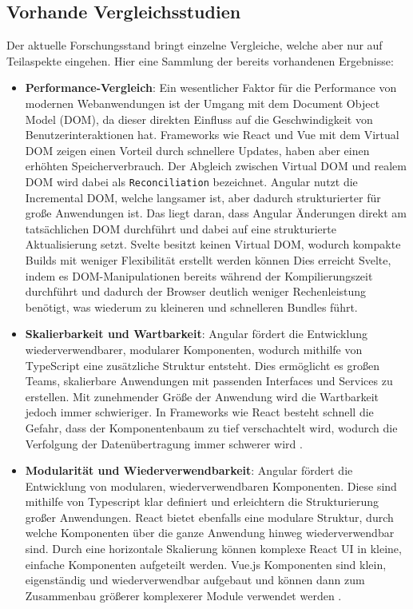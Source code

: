 \documentclass[oneside]{ausarbeitung}
\begin{document}
\subsection{Vorhande Vergleichsstudien}
Der aktuelle Forschungsstand bringt einzelne Vergleiche, welche aber nur auf Teilaspekte eingehen. Hier eine Sammlung der bereits vorhandenen Ergebnisse: 
\begin{itemize}
\item \textbf{Performance-Vergleich}: Ein wesentlicher Faktor für die Performance von modernen Webanwendungen ist der Umgang mit dem Document Object Model (DOM), da dieser direkten Einfluss auf die Geschwindigkeit von Benutzerinteraktionen hat. 
Frameworks wie React und Vue mit dem Virtual DOM zeigen einen Vorteil durch schnellere Updates, haben aber einen erhöhten Speicherverbrauch. Der Abgleich zwischen Virtual DOM und realem DOM wird dabei als \texttt{Reconciliation} bezeichnet. Angular nutzt die Incremental DOM, welche langsamer ist, aber dadurch strukturierter für große Anwendungen ist. Das liegt daran, dass Angular Änderungen direkt am tatsächlichen DOM durchführt und dabei auf eine strukturierte Aktualisierung setzt. Svelte besitzt keinen Virtual DOM, wodurch kompakte Builds mit weniger Flexibilität erstellt werden können\parencite[S.61]{js-framework-comparison}
Dies erreicht Svelte, indem es DOM-Manipulationen bereits während der Kompilierungszeit durchführt und dadurch der Browser deutlich weniger Rechenleistung benötigt, was wiederum zu kleineren und schnelleren Bundles führt.  \parencite[S.26]{comparison-frameworks-scalable-apps}
    
\item \textbf{Skalierbarkeit und Wartbarkeit}: Angular fördert die Entwicklung wiederverwendbarer, modularer Komponenten, wodurch mithilfe von TypeScript eine zusätzliche Struktur entsteht. Dies ermöglicht es großen Teams, skalierbare Anwendungen mit passenden Interfaces und Services zu erstellen. Mit zunehmender Größe der Anwendung wird die Wartbarkeit jedoch immer schwieriger. In Frameworks wie React besteht schnell die Gefahr, dass der Komponentenbaum zu tief verschachtelt wird, wodurch die Verfolgung der Datenübertragung immer schwerer wird \parencite[S. 25,28]{comparison-frameworks-scalable-apps}.
    \item \textbf{Modularität und Wiederverwendbarkeit}: Angular fördert die Entwicklung von modularen, wiederverwendbaren Komponenten. Diese sind mithilfe von Typescript klar definiert und erleichtern die Strukturierung großer Anwendungen. React bietet ebenfalls eine modulare Struktur, durch welche Komponenten über die ganze Anwendung hinweg wiederverwendbar sind. Durch eine horizontale Skalierung können komplexe React UI in kleine, einfache Komponenten aufgeteilt werden. Vue.js Komponenten sind klein, eigenständig und wiederverwendbar aufgebaut und können dann zum Zusammenbau größerer komplexerer Module verwendet werden \cite[S. 24,26] {comparison-frameworks-scalable-apps}.
    
\end{itemize}
\end{document}

